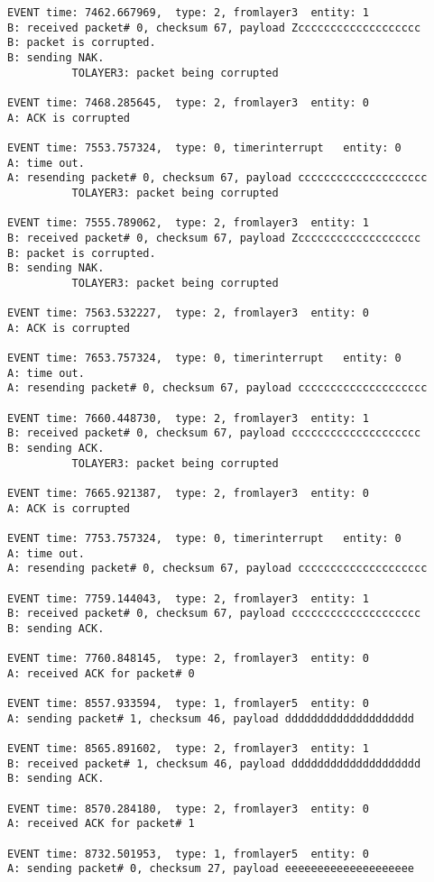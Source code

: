 \documentclass[12pt]{article}
\begin{document}
\begin{verbatim}
EVENT time: 7462.667969,  type: 2, fromlayer3  entity: 1
B: received packet# 0, checksum 67, payload Zccccccccccccccccccc
B: packet is corrupted.
B: sending NAK.
          TOLAYER3: packet being corrupted

EVENT time: 7468.285645,  type: 2, fromlayer3  entity: 0
A: ACK is corrupted

EVENT time: 7553.757324,  type: 0, timerinterrupt   entity: 0
A: time out. 
A: resending packet# 0, checksum 67, payload cccccccccccccccccccc
          TOLAYER3: packet being corrupted

EVENT time: 7555.789062,  type: 2, fromlayer3  entity: 1
B: received packet# 0, checksum 67, payload Zccccccccccccccccccc
B: packet is corrupted.
B: sending NAK.
          TOLAYER3: packet being corrupted

EVENT time: 7563.532227,  type: 2, fromlayer3  entity: 0
A: ACK is corrupted

EVENT time: 7653.757324,  type: 0, timerinterrupt   entity: 0
A: time out. 
A: resending packet# 0, checksum 67, payload cccccccccccccccccccc

EVENT time: 7660.448730,  type: 2, fromlayer3  entity: 1
B: received packet# 0, checksum 67, payload cccccccccccccccccccc
B: sending ACK.
          TOLAYER3: packet being corrupted

EVENT time: 7665.921387,  type: 2, fromlayer3  entity: 0
A: ACK is corrupted

EVENT time: 7753.757324,  type: 0, timerinterrupt   entity: 0
A: time out. 
A: resending packet# 0, checksum 67, payload cccccccccccccccccccc	

EVENT time: 7759.144043,  type: 2, fromlayer3  entity: 1
B: received packet# 0, checksum 67, payload cccccccccccccccccccc
B: sending ACK.

EVENT time: 7760.848145,  type: 2, fromlayer3  entity: 0
A: received ACK for packet# 0

EVENT time: 8557.933594,  type: 1, fromlayer5  entity: 0
A: sending packet# 1, checksum 46, payload dddddddddddddddddddd	

EVENT time: 8565.891602,  type: 2, fromlayer3  entity: 1
B: received packet# 1, checksum 46, payload dddddddddddddddddddd
B: sending ACK.

EVENT time: 8570.284180,  type: 2, fromlayer3  entity: 0
A: received ACK for packet# 1

EVENT time: 8732.501953,  type: 1, fromlayer5  entity: 0
A: sending packet# 0, checksum 27, payload eeeeeeeeeeeeeeeeeeee	


\end{verbatim}
\end{document}
